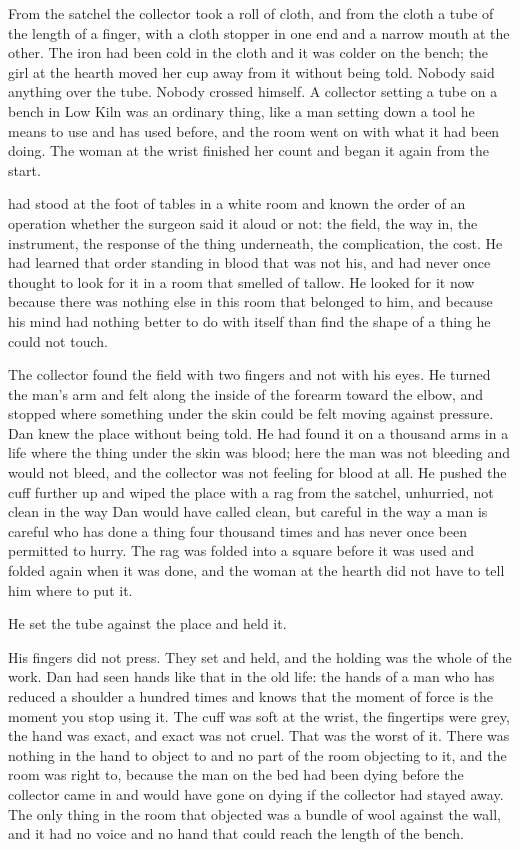 From the satchel the collector took a roll of cloth, and from the cloth a tube of  the length of a finger, with a cloth stopper in one end and a narrow mouth at the other. The iron had been cold in the cloth and it was colder on the bench; the girl at the hearth moved her cup away from it without being told. Nobody said anything over the tube. Nobody crossed himself. A collector setting a tube on a bench in Low Kiln was an ordinary thing, like a man setting down a tool he means to use and has used before, and the room went on with what it had been doing. The woman at the wrist finished her count and began it again from the start.

\scenebreak

 had stood at the foot of tables in a white room and known the order of an operation whether the surgeon said it aloud or not: the field, the way in, the instrument, the response of the thing underneath, the complication, the cost. He had learned that order standing in blood that was not his, and had never once thought to look for it in a room that smelled of tallow. He looked for it now because there was nothing else in this room that belonged to him, and because his mind had nothing better to do with itself than find the shape of a thing he could not touch.

The collector found the field with two fingers and not with his eyes. He turned the man's arm and felt along the inside of the forearm toward the elbow, and stopped where something under the skin could be felt moving against pressure. Dan knew the place without being told. He had found it on a thousand arms in a life where the thing under the skin was blood; here the man was not bleeding and would not bleed, and the collector was not feeling for blood at all. He pushed the cuff further up and wiped the place with a rag from the satchel, unhurried, not clean in the way Dan would have called clean, but careful in the way a man is careful who has done a thing four thousand times and has never once been permitted to hurry. The rag was folded into a square before it was used and folded again when it was done, and the woman at the hearth did not have to tell him where to put it.

He set the tube against the place and held it.

His fingers did not press. They set and held, and the holding was the whole of the work. Dan had seen hands like that in the old life: the hands of a man who has reduced a shoulder a hundred times and knows that the moment of force is the moment you stop using it. The cuff was soft at the wrist, the fingertips were grey, the hand was exact, and exact was not cruel. That was the worst of it. There was nothing in the hand to object to and no part of the room objecting to it, and the room was right to, because the man on the bed had been dying before the collector came in and would have gone on dying if the collector had stayed away. The only thing in the room that objected was a bundle of wool against the wall, and it had no voice and no hand that could reach the length of the bench.

